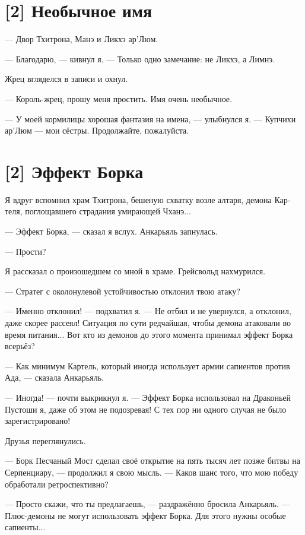 \documentclass[a4paper,12pt,fleqn]{book}\usepackage{polyglossia}\setdefaultlanguage[babelshorthands=true]{russian}\setotherlanguage{english}\defaultfontfeatures{Ligatures=TeX,Mapping=tex-text}\usepackage{xcolor}\newcommand{\ml}[3]{#2}
\begin{document}
{\section{[2] Необычное имя}

--- Двор Тхитрона, Манэ и Ликхэ ар'Люм.

--- Благодарю, --- кивнул я.
--- Только одно замечание: не Ликхэ, а Лимнэ.

Жрец вгляделся в записи и охнул.

--- Король-жрец, прошу меня простить.
Имя очень необычное.

--- У моей кормилицы хорошая фантазия на имена, --- улыбнулся я.
--- Купчихи ар'Люм --- мои сёстры.
Продолжайте, пожалуйста.

\section{[2] Эффект Борка}

Я вдруг вспомнил храм Тхитрона, бешеную схватку возле алтаря, демона Картеля, поглощавшего страдания умирающей Чханэ...

--- Эффект Борка, --- сказал я вслух.
Анкарьяль запнулась.

--- Прости?

Я рассказал о произошедшем со мной в храме.
Грейсвольд нахмурился.

--- Стратег с околонулевой устойчивостью отклонил твою атаку?

--- Именно отклонил! --- подхватил я.
--- Не отбил и не увернулся, а отклонил, даже скорее рассеял!
Ситуация по сути редчайшая, чтобы демона атаковали во время питания...
Вот кто из демонов до этого момента принимал эффект Борка всерьёз?

--- Как минимум Картель, который иногда использует армии сапиентов против Ада, --- сказала Анкарьяль.

--- Иногда! --- почти выкрикнул я.
--- Эффект Борка использовал на Драконьей Пустоши я, даже об этом не подозревая!
С тех пор ни одного случая не было зарегистрировано!

Друзья переглянулись.

--- Борк Песчаный Мост сделал своё открытие на пять тысяч лет позже битвы на Серпенциару, --- продолжил я свою мысль.
--- Каков шанс того, что мою победу обработали ретроспективно?

--- Просто скажи, что ты предлагаешь, --- раздражённо бросила Анкарьяль.
--- Плюс-демоны не могут использовать эффект Борка.
Для этого нужны особые сапиенты...

}
\end{document}
